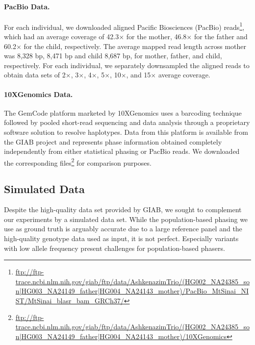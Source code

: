 \paragraph{PacBio Data.} For each individual, we downloaded aligned Pacific Biosciences (PacBio) reads\footnote{\scriptsize{\url{ftp://ftp-trace.ncbi.nlm.nih.gov/giab/ftp/data/AshkenazimTrio/(HG002_NA24385_son|HG003_NA24149_father|HG004_NA24143_mother)/PacBio_MtSinai_NIST/MtSinai_blasr_bam_GRCh37/}}},  
which had an average coverage of 42.3$\times$ for the mother, 46.8$\times$ for the father and 60.2$\times$ for the child, respectively.
The average mapped read length across mother was 8,328 bp, 8,471 bp and child 8,687 bp, for mother, father, and child, respectively.
For each individual, we separately downsampled the aligned reads to obtain data sets of 2$\times$, 3$\times$, 4$\times$, 5$\times$, 10$\times$, and 15$\times$ average coverage.

\paragraph{10XGenomics Data.}
The GemCode platform marketed by 10XGenomics uses a barcoding technique followed by pooled short-read sequencing and data analysis through a proprietary software solution to resolve haplotypes.
Data from this platform is available from the GIAB project and represents phase information obtained completely independently from either statistical phasing or PacBio reads.
We downloaded the corresponding files\footnote{\scriptsize{\url{ftp://ftp-trace.ncbi.nlm.nih.gov/giab/ftp/data/AshkenazimTrio/(HG002_NA24385_son|HG003_NA24149_father|HG004_NA24143_mother)/10XGenomics}}} for comparison purposes.

\subsection{Simulated Data}
Despite the high-quality data set provided by GIAB, we sought to complement our experiments by a simulated data set.
While the population-based phasing we use as ground truth is arguably accurate due to a large reference panel and the high-quality genotype data used as input, it is not perfect.
Especially variants with low allele frequency present challenges for population-based phasers.

